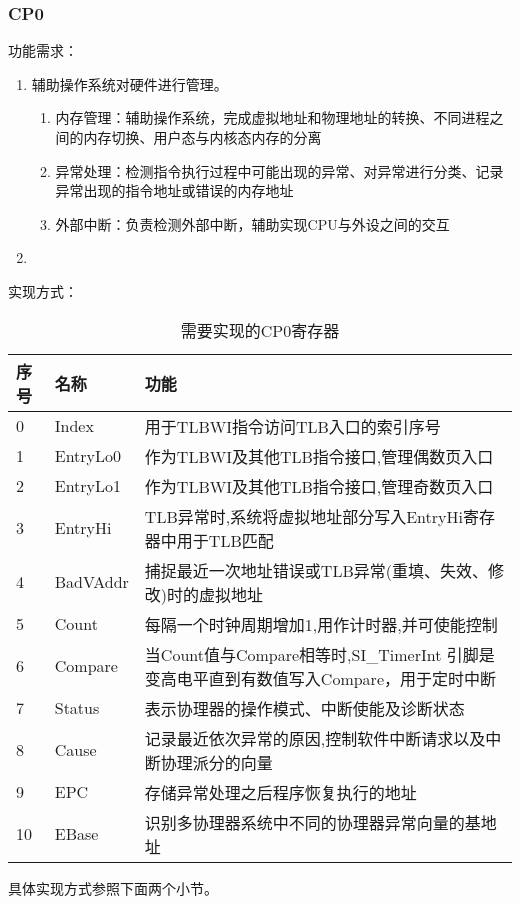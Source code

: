         \subsubsection{CP0}
            功能需求：
            \begin{enumerate}
            \item
                辅助操作系统对硬件进行管理。
                \begin{enumerate}
                \item
                    内存管理：辅助操作系统，完成虚拟地址和物理地址的转换、不同进程之间的内存切换、用户态与内核态内存的分离
                \item
                    异常处理：检测指令执行过程中可能出现的异常、对异常进行分类、记录异常出现的指令地址或错误的内存地址
                \item
                    外部中断：负责检测外部中断，辅助实现CPU与外设之间的交互
                \end{enumerate}
            \item

            \end{enumerate}

            实现方式：
            \begin{table}[!hbp]
            \centering
            \caption{需要实现的CP0寄存器}
            \begin{tabularx}{\textwidth}{|l|l|X|}
            \hline
            序号 & 名称 & 功能 \\
            \hline
            0 & Index & 用于TLBWI指令访问TLB入口的索引序号 \\
            \hline
            1 & EntryLo0 & 作为TLBWI及其他TLB指令接口,管理偶数页入口 \\
            \hline
            2 & EntryLo1 & 作为TLBWI及其他TLB指令接口,管理奇数页入口 \\
            \hline
            3 & EntryHi & TLB异常时,系统将虚拟地址部分写入EntryHi寄存器中用于TLB匹配 \\
            \hline
            4 & BadVAddr & 捕捉最近一次地址错误或TLB异常(重填、失效、修改)时的虚拟地址 \\
            \hline
            5 & Count & 每隔一个时钟周期增加1,用作计时器,并可使能控制 \\
            \hline
            6 & Compare & 当Count值与Compare相等时,SI\_TimerInt 引脚是变高电平直到有数值写入Compare，用于定时中断 \\
            \hline
            7 & Status & 表示协理器的操作模式、中断使能及诊断状态 \\
            \hline
            8 & Cause & 记录最近依次异常的原因,控制软件中断请求以及中断协理派分的向量 \\
            \hline
            9 & EPC & 存储异常处理之后程序恢复执行的地址 \\
            \hline
            10 & EBase & 识别多协理器系统中不同的协理器异常向量的基地址 \\
            \hline
            \end{tabularx}
            \end{table}
            具体实现方式参照下面两个小节。

